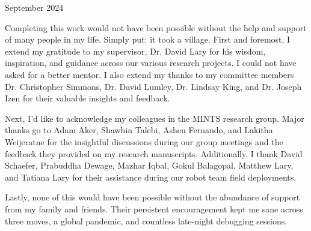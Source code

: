 \begin{acks}{September 2024}

  Completing this work would not have been possible without the help and support
  of many people in my life. Simply put: it took a village.
  First and foremost, I extend my gratitude to my supervisor, Dr.
  David Lary for his wisdom, inspiration, and guidance across our various
  research projects. I could not have asked for a better mentor. I also extend my
  thanks to my committee members Dr. Christopher Simmons, Dr. David Lumley, Dr.
  Lindsay King, and Dr. Joseph Izen for their valuable insights and feedback.

  Next, I'd like to acknowledge my colleagues in the MINTS
  research group. Major thanks go to Adam Aker, Shawhin Talebi, Ashen
  Fernando, and Lakitha Weijeratne for the insightful discussions during our
  group meetings and the feedback they provided
  on my research manuscripts. Additionally, I thank David Schaefer, Prabuddha
  Dewage, Mazhar Iqbal, Gokul Balagopal, Matthew Lary, and Tatiana Lary for
  their assistance during our robot team field deployments.

  Lastly, none of this would have been possible without the abundance of support
  from my family and friends. Their persistent encouragement kept me sane across
  three moves, a global pandemic, and countless late-night debugging sessions.

\end{acks}

